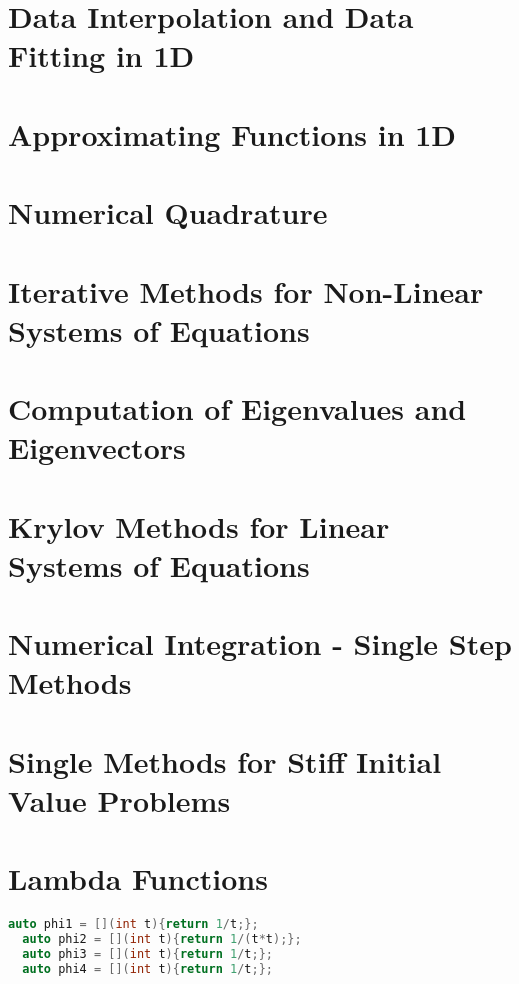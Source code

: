 \documentclass{sciposter}
\begin{document}
\begin{multicols}{2}
\section{Data Interpolation and Data Fitting in 1D}

\section{Approximating Functions in 1D}

\section{Numerical Quadrature}

\section{Iterative Methods for Non-Linear Systems of Equations}

\section{Computation of Eigenvalues and Eigenvectors}

\section{Krylov Methods for Linear Systems of Equations}

\section{Numerical Integration - Single Step Methods}

\section{Single Methods for Stiff Initial Value Problems}


	

\section{Lambda Functions}
\begin{lstlisting}[language=C++]
  auto phi1 = [](int t){return 1/t;};
  auto phi2 = [](int t){return 1/(t*t);};
  auto phi3 = [](int t){return 1/t;};
  auto phi4 = [](int t){return 1/t;};
\end{lstlisting}






\end{multicols}
\end{document}
